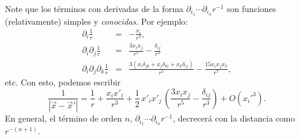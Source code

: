 Note que los términos con derivadas de la forma $\partial_{i_1}\cdots
\partial_{i_n}r^{-1}$ son funciones (relativamente) simples y \textit{conocidas}.
Por ejemplo:
\begin{eqnarray}
\partial_i\frac{1}{r}&=&-\frac{x_i}{r^3}, \\
\partial_i\partial_j\frac{1}{r}
&=& \frac{3x_ix_j}{r^5}-\frac{\delta_{ij}}{r^3} \\
\partial_i\partial_j\partial_k\frac{1}{r}
&=& \frac{3\left(x_i\delta_{jk}+x_j\delta_{ki}+x_k\delta_{ij}\right)}{r^5}
-\frac{15x_ix_jx_k}{r^7},
\end{eqnarray}
etc. Con esto, podemos escribir
\begin{equation} \label{eq3.2.3}
\frac{1}{|\vec{x}-\vec{x}'|}=\frac{1}{r}+\frac{x_ix'_i}{r^3}
+\frac{1}{2}\,x'_ix'_j\,\left(\frac{3x_ix_j}{r^5}-\frac{\delta_{ij}}{
r^3}\right)+O\left(x_i'^3\right).
\end{equation}
En general, el término de orden $n$, $\partial_{i_1}\cdots
\partial_{i_n}r^{-1}$, decrecerá con la distancia como $r^{-(n+1)}$.

